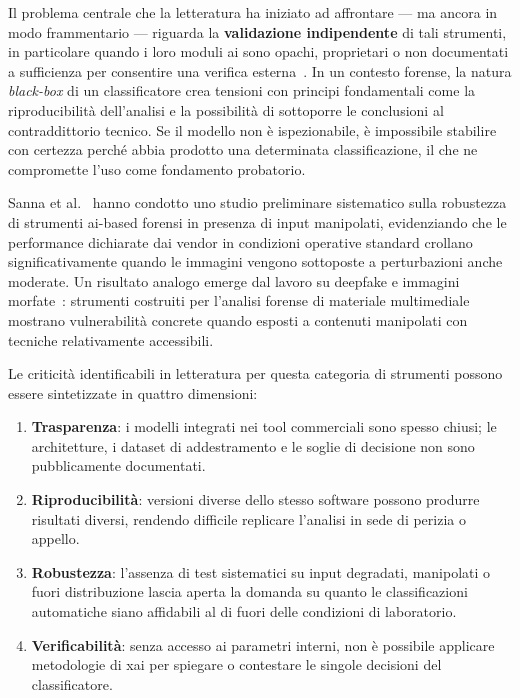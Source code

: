 Il problema centrale che la letteratura ha iniziato ad affrontare — ma ancora in modo frammentario — riguarda la \textbf{validazione indipendente} di tali strumenti, in particolare quando i loro moduli \gls{ai} sono opachi, proprietari o non documentati a sufficienza per consentire una verifica esterna~\cite{sanna2024preliminary}. In un contesto forense, la natura \textit{black-box} di un classificatore crea tensioni con principi fondamentali come la riproducibilità dell'analisi e la possibilità di sottoporre le conclusioni al contraddittorio tecnico. Se il modello non è ispezionabile, è impossibile stabilire con certezza perché abbia prodotto una determinata classificazione, il che ne compromette l'uso come fondamento probatorio.

Sanna et al.~\cite{sanna2024preliminary} hanno condotto uno studio preliminare sistematico sulla robustezza di strumenti \gls{ai}-based forensi in presenza di input manipolati, evidenziando che le performance dichiarate dai vendor in condizioni operative standard crollano significativamente quando le immagini vengono sottoposte a perturbazioni anche moderate. Un risultato analogo emerge dal lavoro su deepfake e immagini morfate~\cite{sanna2025pixelperfect}: strumenti costruiti per l'analisi forense di materiale multimediale mostrano vulnerabilità concrete quando esposti a contenuti manipolati con tecniche relativamente accessibili.

Le criticità identificabili in letteratura per questa categoria di strumenti possono essere sintetizzate in quattro dimensioni:

\begin{enumerate}
    \item \textbf{Trasparenza}: i modelli integrati nei tool commerciali sono spesso chiusi; le architetture, i dataset di addestramento e le soglie di decisione non sono pubblicamente documentati.
    \item \textbf{Riproducibilità}: versioni diverse dello stesso software possono produrre risultati diversi, rendendo difficile replicare l'analisi in sede di perizia o appello.
    \item \textbf{Robustezza}: l'assenza di test sistematici su input degradati, manipolati o fuori distribuzione lascia aperta la domanda su quanto le classificazioni automatiche siano affidabili al di fuori delle condizioni di laboratorio.
    \item \textbf{Verificabilità}: senza accesso ai parametri interni, non è possibile applicare metodologie di \gls{xai} per spiegare o contestare le singole decisioni del classificatore.
\end{enumerate}

